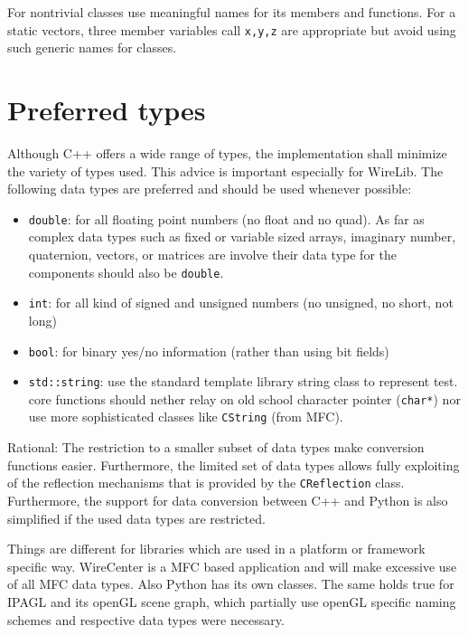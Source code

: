 \documentclass[11pt,a4paper,onepage,openany]{book}
\begin{document}
For nontrivial classes use meaningful names for its members and functions. For
a static vectors, three member variables call \texttt{x,y,z} are appropriate
but avoid using such generic names for classes.

\section{Preferred types}
Although C++ offers a wide range of types, the implementation shall minimize
the variety of types used. This advice is important especially for WireLib.
The
following data types are preferred and should be used whenever possible:
\begin{itemize}
  \item \texttt{double}: for all floating point numbers (no float and no
      quad). As far as complex data types such as fixed or variable sized
      arrays, imaginary number, quaternion, vectors, or matrices are involve
      their data type for the components should also be \texttt{double}.

  \item \texttt{int}: for all kind of signed and unsigned numbers (no
      unsigned, no short, not long)

  \item \texttt{bool}: for binary yes/no information (rather than using bit
      fields)

  \item \texttt{std::string}: use the standard template library string class
      to represent test. core functions should nether relay on old school
      character pointer (\texttt{char*}) nor use more sophisticated classes
      like \texttt{CString} (from MFC).
\end{itemize}
Rational: The restriction to a smaller subset of data types make conversion
functions easier. Furthermore, the limited set of data types allows fully
exploiting of the reflection mechanisms that is provided by the
\texttt{CReflection} class. Furthermore, the support for data conversion
between C++ and Python is also simplified if the used data types are
restricted.

Things are different for libraries which are used in a platform or framework
specific way. WireCenter is a MFC based application and will make excessive use
of all MFC data types. Also Python has its own classes. The same holds true for
IPAGL and its openGL scene graph, which partially use openGL specific naming
schemes and respective data types were necessary.
\end{document}
